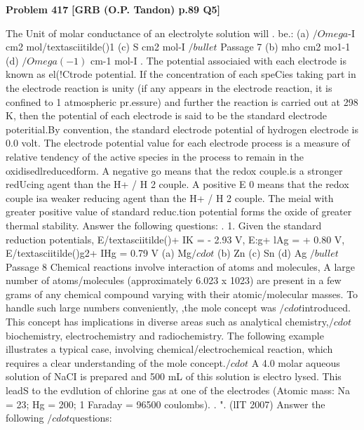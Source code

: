 \begin{problembox}
\textbf{Problem 417} \hfill \textbf{[GRB (O.P. Tandon) p.89 Q5]}
\label{q:ext-grb_all_questions-417}

The Unit of molar conductance of an electrolyte solution will 
. be.: 
(a) $/Omega$-I cm2 mol/textasciitilde()1 
(c) S cm2 mol-I 
$/bullet$ Passage 7 
(b) mho cm2 mo1-1 
(d) $/Omega(-1)$ cm-1 mol-I 
. The potential associaied with each electrode is known as 
el(!Ctrode potential. If the concentration of each speCies taking part 
in the electrode reaction is unity (if any appears in the electrode 
reaction, it is confined to 1 atmospheric pr.essure) and further the 
reaction is carried out at 298 K, then the potential of each electrode 
is said to be the standard electrode poteritial.By convention, the 
standard electrode potential of hydrogen electrode is 0.0 volt. The 
electrode potential value for each electrode process is a measure of 
relative tendency of the active species in the process to remain in the 
oxidisedlreducedform. A negative go means that the redox couple.is 
a stronger redUcing agent than the H+ / H 2 couple. A positive E 0 
means that the redox couple isa weaker reducing agent than the 
H+ / H 2 couple. The meial with greater positive value of standard 
reduc.tion potential forms the oxide of greater thermal stability. 
Answer the following questions: 
. 1. Given the standard reduction potentials, 
E/textasciitilde()+ IK = - 2.93 V, E:g+ lAg = + 0.80 V, E/textasciitilde()g2+ IHg = 0.79 V 
(a) Mg$/cdot$ 
(b) Zn 
(c) Sn 
(d) Ag 
$/bullet$ Passage 8 
Chemical reactions involve interaction of atoms and molecules, A 
large number of atoms/molecules (approximately 6.023 x 1023) are 
present in a few grams of any chemical compound varying with their 
atomic/molecular masses. 
To 
handle such 
large 
numbers 
conveniently, ,the mole concept was $/cdot$introduced. This concept has 
implications in diverse areas such as analytical chemistry,$/cdot$ 
biochemistry, electrochemistry and radiochemistry. The following 
example 
illustrates 
a 
typical 
case, 
involving 
chemical/electrochemical 
reaction, 
which 
requires 
a 
clear 
understanding of the mole concept.$/cdot$ 
A 4.0 molar aqueous solution of NaCI is prepared and 500 mL of 
this solution is electro lysed. This leadS to the evdlution of chlorine 
gas at one of the electrodes (Atomic mass: Na = 23; Hg = 200; 
1 Faraday = 96500 coulombs). . 
". (lIT 2007) 
Answer the following $/cdot$questions:
\end{problembox}

